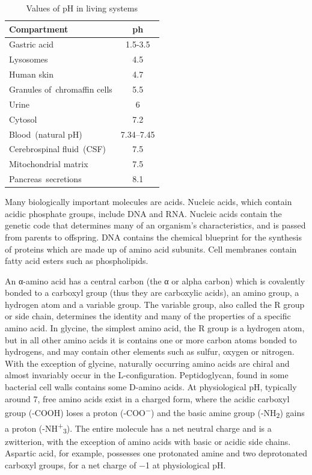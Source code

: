 \begin{table}[!h]

\caption{\label{tab:pH}Values of pH in living systems}
\centering
\begin{tabular}[t]{lc}
\toprule
Compartment & ph\\
\midrule
\rowcolor{gray!6}  Gastric acid & 1.5-3.5\\
Lysosomes & 4.5\\
\rowcolor{gray!6}  Human skin & 4.7\\
Granules of chromaffin cells & 5.5\\
\rowcolor{gray!6}  Urine & 6\\
\addlinespace
Cytosol & 7.2\\
\rowcolor{gray!6}  Blood (natural pH) & 7.34–7.45\\
Cerebrospinal fluid (CSF) & 7.5\\
\rowcolor{gray!6}  Mitochondrial matrix & 7.5\\
Pancreas secretions & 8.1\\
\bottomrule
\end{tabular}
\end{table}

Many biologically important molecules are acids. Nucleic acids, which contain acidic phosphate groups, include DNA and RNA. Nucleic acids contain the genetic code that determines many of an organism's characteristics, and is passed from parents to offspring. DNA contains the chemical blueprint for the synthesis of proteins which are made up of amino acid subunits. Cell membranes contain fatty acid esters such as phospholipids.

An α-amino acid has a central carbon (the α or alpha carbon) which is covalently bonded to a carboxyl group (thus they are carboxylic acids), an amino group, a hydrogen atom and a variable group. The variable group, also called the R group or side chain, determines the identity and many of the properties of a specific amino acid. In glycine, the simplest amino acid, the R group is a hydrogen atom, but in all other amino acids it is contains one or more carbon atoms bonded to hydrogens, and may contain other elements such as sulfur, oxygen or nitrogen. With the exception of glycine, naturally occurring amino acids are chiral and almost invariably occur in the L-configuration. Peptidoglycan, found in some bacterial cell walls contains some D-amino acids. At physiological pH, typically around 7, free amino acids exist in a charged form, where the acidic carboxyl group (-COOH) loses a proton (-COO\textsuperscript{−}) and the basic amine group (-NH\textsubscript{2}) gains a proton (-NH\textsuperscript{+}\textsubscript{3}). The entire molecule has a net neutral charge and is a zwitterion, with the exception of amino acids with basic or acidic side chains. Aspartic acid, for example, possesses one protonated amine and two deprotonated carboxyl groups, for a net charge of −1 at physiological pH.

